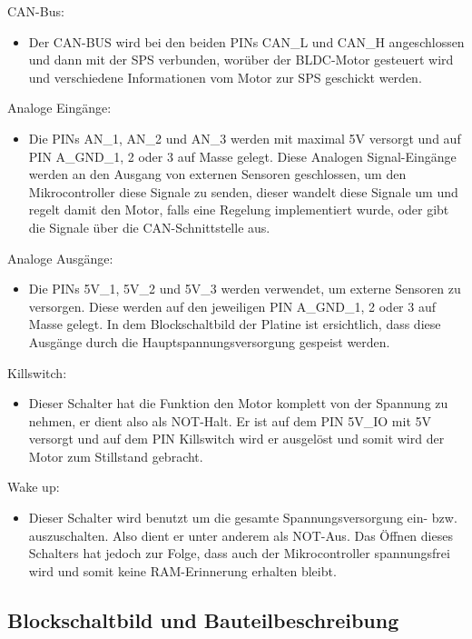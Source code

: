 CAN-Bus:
\begin{itemize}
    \item Der CAN-BUS wird bei den beiden PINs CAN\_L und CAN\_H angeschlossen und dann mit der SPS verbunden, worüber der BLDC-Motor gesteuert wird und verschiedene Informationen vom Motor zur SPS geschickt werden. \cite{SONCEBOZ}
\end{itemize}

Analoge Eingänge:
\begin{itemize}
    \item 
    Die PINs AN\_1, AN\_2 und AN\_3 werden mit maximal 5V versorgt und auf PIN A\_GND\_1, 2 oder 3 auf Masse gelegt. 
    Diese Analogen Signal-Eingänge werden an den Ausgang von externen Sensoren geschlossen, um den Mikrocontroller diese Signale zu senden, 
    dieser wandelt diese Signale um und regelt damit den Motor, falls eine Regelung implementiert wurde, oder gibt die Signale über die CAN-Schnittstelle aus. \cite{SONCEBOZ}
\end{itemize}

Analoge Ausgänge:
\begin{itemize}
    \item Die PINs 5V\_1, 5V\_2 und 5V\_3 werden verwendet, um externe Sensoren zu versorgen. Diese werden auf den jeweiligen PIN A\_GND\_1, 2 oder 3 auf Masse gelegt. In dem Blockschaltbild der Platine ist ersichtlich, dass diese Ausgänge durch die Hauptspannungsversorgung gespeist werden. \cite{SONCEBOZ}
\end{itemize}

Killswitch:
\begin{itemize}
    \item Dieser Schalter hat die Funktion den Motor komplett von der Spannung zu nehmen, er dient also als NOT-Halt. Er ist auf dem PIN 5V\_IO mit 5V versorgt und auf dem PIN Killswitch wird er ausgelöst und somit wird der Motor zum Stillstand gebracht. \cite{SONCEBOZ}
\end{itemize}

Wake up:
\begin{itemize}
    \item Dieser Schalter wird benutzt um die gesamte Spannungsversorgung ein- bzw. auszuschalten. Also dient er unter anderem als NOT-Aus. Das Öffnen dieses Schalters hat jedoch zur Folge, dass auch der Mikrocontroller spannungsfrei wird und somit keine RAM-Erinnerung erhalten bleibt.  \cite{SONCEBOZ}
\end{itemize}

\clearpage
\subsection{Blockschaltbild und Bauteilbeschreibung}

